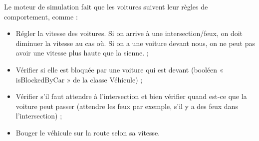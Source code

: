 \documentclass[12pt]{article} %
\begin{document}
Le moteur de simulation fait que les voitures suivent leur règles de comportement, comme :
\begin{itemize}
\item Régler la vitesse des voitures. Si on arrive à une intersection/feux, on doit diminuer la vitesse au cas où. Si on a une voiture devant nous, on ne peut pas avoir une vitesse plus haute que la sienne. ;\\

\item Vérifier si elle est bloquée par une voiture qui est devant (booléen « isBlockedByCar » de la classe Véhicule) ;\\

\item Vérifier s'il faut attendre à l'intersection et bien vérifier quand est-ce que la voiture peut passer (attendre les feux par exemple, s'il y a des feux dans l'intersection) ;\\

\item Bouger le véhicule sur la route selon sa vitesse.
\end{itemize} 
\end{document}
